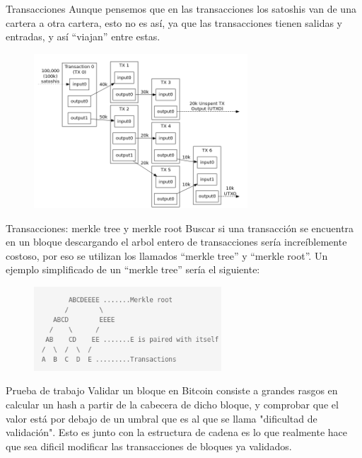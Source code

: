\documentclass[compress,brown,xcolor=table]{beamer}
\begin{document}
\begin{frame}{Transacciones}
	Aunque pensemos que en las transacciones los satoshis van de una cartera a otra cartera, esto no es así, ya que las transacciones tienen salidas y entradas, y así ``viajan'' entre estas. 
	\begin{figure}[h]
	\includegraphics[width=8cm]{../images/transactions.png}
	\centering		
	\label{p3}
\end{figure}
\end{frame}

\begin{frame}{Transacciones: merkle tree y merkle root}
	Buscar si una transacción se encuentra en un bloque descargando el arbol entero de transacciones sería increíblemente costoso, por eso se utilizan los llamados ``merkle tree'' y ``merkle root''.
	Un ejemplo simplificado de un ``merkle tree'' sería el siguiente:
	\begin{figure}[h]
	\includegraphics[width=7cm]{../images/merkleroot.png}
	\centering		
	\label{p5}
\end{figure}
\end{frame}

\begin{frame}{Prueba de trabajo}
	Validar un bloque en Bitcoin consiste a grandes rasgos en calcular un hash a partir de la cabecera de dicho bloque, y comprobar que el valor está por debajo de un umbral que es al que se llama "dificultad de validación". Esto es junto con la estructura de cadena es lo que realmente hace que sea dificil modificar las transacciones de bloques ya validados.
\end{frame}
\end{document}
